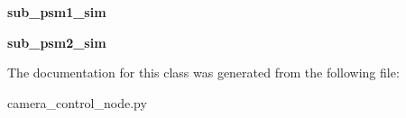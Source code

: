 \begin{DoxyCompactItemize}
\item 
\hypertarget{classcamera__control__node_1_1Autocamera__node__handler_a8398b5c30ed0deddcf66b6a00ea6fde2}{{\bfseries sub\-\_\-psm1\-\_\-sim}}\label{classcamera__control__node_1_1Autocamera__node__handler_a8398b5c30ed0deddcf66b6a00ea6fde2}

\item 
\hypertarget{classcamera__control__node_1_1Autocamera__node__handler_afe0db682ff11042a4d3659e0d8a698f9}{{\bfseries sub\-\_\-psm2\-\_\-sim}}\label{classcamera__control__node_1_1Autocamera__node__handler_afe0db682ff11042a4d3659e0d8a698f9}

\end{DoxyCompactItemize}


The documentation for this class was generated from the following file\-:\begin{DoxyCompactItemize}
\item 
camera\-\_\-control\-\_\-node.\-py\end{DoxyCompactItemize}
